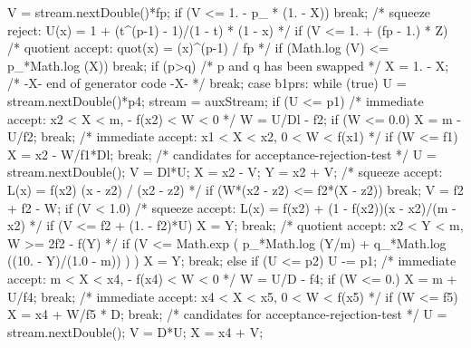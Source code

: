 \begin{code}
\begin{hide}
{{{{               V = stream.nextDouble()*fp;
               if (V <= 1. - p_ * (1. - X))
                  break;
               /* squeeze reject: U(x) = 1 + (t^(p-1) - 1)/(1 - t) * (1 - x) */
               if (V <= 1. + (fp - 1.) * Z)
                  /* quotient accept:  quot(x) = (x)^(p-1) / fp          */
                  if (Math.log (V) <= p_*Math.log (X))
                     break;
            }
         }
         if (p>q)
            /* p and q has been swapped */
            X = 1. - X;
         /* -X- end of generator code -X- */
         break;
      case b1prs:
         while (true) {
           U = stream.nextDouble()*p4;
           stream = auxStream;
            if (U <= p1) {
               /* immediate accept:  x2 < X < m, - f(x2) < W < 0         */
               W = U/Dl - f2;
               if (W <= 0.0) {
                  X = m - U/f2;
                  break;
               }
               /* immediate accept:  x1 < X < x2, 0 < W < f(x1)          */
               if (W <= f1) {
                  X = x2 - W/f1*Dl;
                  break;
               }
               /* candidates for acceptance-rejection-test              */
               U = stream.nextDouble();
               V = Dl*U;
               X = x2 - V;
               Y = x2 + V;
               /* squeeze accept:    L(x) = f(x2) (x - z2) / (x2 - z2)   */
               if (W*(x2 - z2) <= f2*(X - z2))
                  break;
               V = f2 + f2 - W;
               if (V < 1.0) {
             /* squeeze accept: L(x) = f(x2) + (1 - f(x2))(x - x2)/(m - x2)  */
                  if (V <= f2 + (1. - f2)*U) {
                     X = Y;
                     break;
                  }
                  /* quotient accept:   x2 < Y < m,   W >= 2f2 - f(Y)     */
                  if (V <= Math.exp ( p_*Math.log (Y/m) 
                                    + q_*Math.log ((10. - Y)/(1.0 - m)) ) ) {
                     X = Y;
                     break;
                  }
               }
            }
            else if (U <= p2) {
               U -= p1;
               /* immediate accept:  m < X < x4, - f(x4) < W < 0  */
               W = U/D - f4;
               if (W <= 0.) {
                  X = m + U/f4;
                  break;
               }
               /* immediate accept:  x4 < X < x5, 0 < W < f(x5)    */
               if (W <= f5) {
                  X = x4 + W/f5 * D;
                  break;
               }
               /* candidates for acceptance-rejection-test     */
               U = stream.nextDouble();
               V = D*U;
               X = x4 + V;
}}}}
\end{hide}
\end{code}
